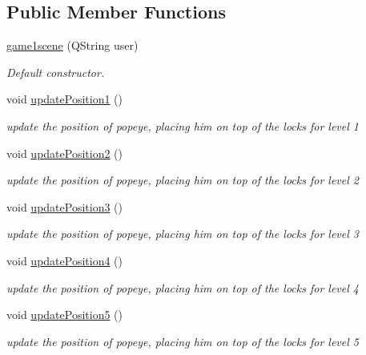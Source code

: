 \subsection*{Public Member Functions}
\begin{DoxyCompactItemize}
\item 
\hyperlink{classgame1scene_af6cd7d94a19719f116b3afa5e49ee0ca}{game1scene} (Q\-String user)
\begin{DoxyCompactList}\small\item\em Default constructor. \end{DoxyCompactList}\item 
void \hyperlink{classgame1scene_a91bc63689e3a89ad7e854fd75434a453}{update\-Position1} ()
\begin{DoxyCompactList}\small\item\em update the position of popeye, placing him on top of the locks for level 1 \end{DoxyCompactList}\item 
void \hyperlink{classgame1scene_a442b205efa59a45cc3a7242e9536acb8}{update\-Position2} ()
\begin{DoxyCompactList}\small\item\em update the position of popeye, placing him on top of the locks for level 2 \end{DoxyCompactList}\item 
void \hyperlink{classgame1scene_ad05ad9fb2c1add7c2c5cfc3570451ebd}{update\-Position3} ()
\begin{DoxyCompactList}\small\item\em update the position of popeye, placing him on top of the locks for level 3 \end{DoxyCompactList}\item 
void \hyperlink{classgame1scene_a8ee0a0271db4868c6e1f5f74da26bf48}{update\-Position4} ()
\begin{DoxyCompactList}\small\item\em update the position of popeye, placing him on top of the locks for level 4 \end{DoxyCompactList}\item 
void \hyperlink{classgame1scene_aa970c577adf4b1c1a063224b2a837c3b}{update\-Position5} ()
\begin{DoxyCompactList}\small\item\em update the position of popeye, placing him on top of the locks for level 5 \end{DoxyCompactList}\item 

\end{DoxyCompactItemize}
